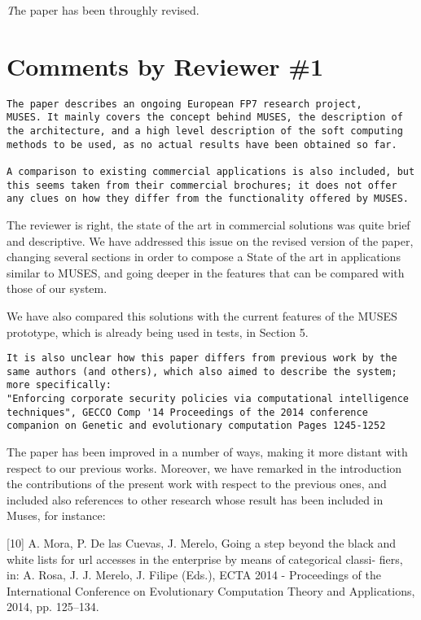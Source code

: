 \documentclass[preprint]{elsarticle}
\begin{document}
{\emph The paper has been throughly revised. 

\section{Comments by Reviewer \#1}

\begin{verbatim}
The paper describes an ongoing European FP7 research project,
MUSES. It mainly covers the concept behind MUSES, the description of
the architecture, and a high level description of the soft computing
methods to be used, as no actual results have been obtained so far. 

A comparison to existing commercial applications is also included, but
this seems taken from their commercial brochures; it does not offer
any clues on how they differ from the functionality offered by MUSES.
\end{verbatim}

The reviewer is right, the state of the art in commercial solutions was quite brief and descriptive.
We have addressed this issue on the revised version of the paper,
changing several sections in order to compose a State of the art in
applications similar to MUSES, and going deeper in the features that
can be compared with those of our system. 

We have also compared this solutions with the current features of the
MUSES prototype, which is already being used in tests, in Section 5.

\begin{verbatim}
It is also unclear how this paper differs from previous work by the
same authors (and others), which also aimed to describe the system;
more specifically: 
"Enforcing corporate security policies via computational intelligence
techniques", GECCO Comp '14 Proceedings of the 2014 conference
companion on Genetic and evolutionary computation Pages 1245-1252  
\end{verbatim}

The paper has been improved in a number of ways, making it more
distant with respect to our previous works. Moreover, we have remarked
in the introduction the contributions of the present work with
respect to the previous ones, and included also references to other
research whose result has been included in Muses, for instance:

[10] A. Mora, P. De las Cuevas, J. Merelo, Going a step beyond the black and
white lists for url accesses in the enterprise by means of categorical classi-
fiers, in: A. Rosa, J. J. Merelo, J. Filipe (Eds.), ECTA 2014 - Proceedings
of the International Conference on Evolutionary Computation Theory and
Applications, 2014, pp. 125–134.


}
\end{document}
